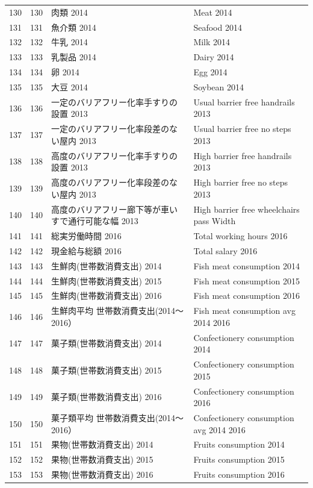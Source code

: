 \begin{table}[ht]
\begin{tabular}{rrll}
  130 & 130 & 肉類 2014 & Meat 2014 \\ 
  131 & 131 & 魚介類 2014 & Seafood 2014 \\ 
  132 & 132 & 牛乳 2014 & Milk 2014 \\ 
  133 & 133 & 乳製品 2014 & Dairy 2014 \\ 
  134 & 134 & 卵 2014 & Egg 2014 \\ 
  135 & 135 & 大豆 2014 & Soybean 2014 \\ 
  136 & 136 & 一定のバリアフリー化率手すりの設置 2013 & Usual barrier free handrails 2013 \\ 
  137 & 137 & 一定のバリアフリー化率段差のない屋内 2013 & Usual barrier free no steps 2013 \\ 
  138 & 138 & 高度のバリアフリー化率手すりの設置 2013 & High barrier free handrails 2013 \\ 
  139 & 139 & 高度のバリアフリー化率段差のない屋内 2013 & High barrier free no steps 2013 \\ 
  140 & 140 & 高度のバリアフリー廊下等が車いすで通行可能な幅 2013 & High barrier free wheelchairs pass Width \\ 
  141 & 141 & 総実労働時間 2016 & Total working hours 2016 \\ 
  142 & 142 & 現金給与総額 2016 & Total salary 2016 \\ 
  143 & 143 & 生鮮肉(世帯数消費支出) 2014 & Fish meat consumption 2014 \\ 
  144 & 144 & 生鮮肉(世帯数消費支出) 2015 & Fish meat consumption 2015 \\ 
  145 & 145 & 生鮮肉(世帯数消費支出) 2016 & Fish meat consumption 2016 \\ 
  146 & 146 & 生鮮肉平均 世帯数消費支出(2014〜2016） & Fish meat consumption avg 2014 2016 \\ 
  147 & 147 & 菓子類(世帯数消費支出) 2014 & Confectionery consumption 2014 \\ 
  148 & 148 & 菓子類(世帯数消費支出) 2015 & Confectionery consumption 2015 \\ 
  149 & 149 & 菓子類(世帯数消費支出) 2016 & Confectionery consumption 2016 \\ 
  150 & 150 & 菓子類平均 世帯数消費支出(2014〜2016） & Confectionery consumption avg 2014 2016 \\ 
  151 & 151 & 果物(世帯数消費支出) 2014 & Fruits consumption 2014 \\ 
  152 & 152 & 果物(世帯数消費支出) 2015 & Fruits consumption 2015 \\ 
  153 & 153 & 果物(世帯数消費支出) 2016 & Fruits consumption 2016 \\ 

\end{tabular}
\end{table}
